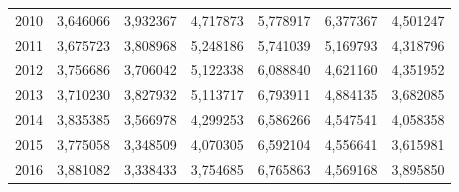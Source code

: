 \begin{table}
\begin{tabular}{p{1cm}p{2cm}p{2cm}p{2cm}p{2cm}p{2cm}p{2cm}}
 2010 &                 3,646066 &                               3,932367 &                                           4,717873 &            5,778917 &    6,377367 &  4,501247 \\
 2011 &                 3,675723 &                               3,808968 &                                           5,248186 &            5,741039 &    5,169793 &  4,318796 \\
 2012 &                 3,756686 &                               3,706042 &                                           5,122338 &            6,088840 &    4,621160 &  4,351952 \\
 2013 &                 3,710230 &                               3,827932 &                                           5,113717 &            6,793911 &    4,884135 &  3,682085 \\
 2014 &                 3,835385 &                               3,566978 &                                           4,299253 &            6,586266 &    4,547541 &  4,058358 \\
 2015 &                 3,775058 &                               3,348509 &                                           4,070305 &            6,592104 &    4,556641 &  3,615981 \\
 2016 &                 3,881082 &                               3,338433 &                                           3,754685 &            6,765863 &    4,569168 &  3,895850 \\
\bottomrule
\end{tabular}
\end{table}

